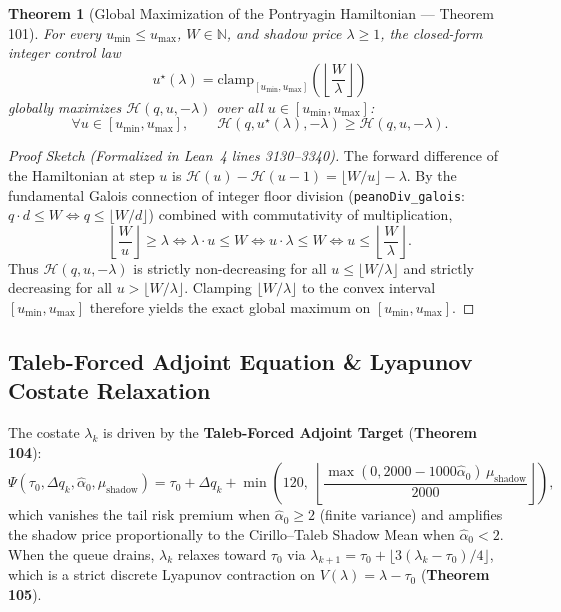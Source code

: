 \documentclass[11pt,a4paper]{article}
\newtheorem{theorem}{Theorem}[section]
\theoremstyle{definition}
\begin{document}
\begin{theorem}[Global Maximization of the Pontryagin Hamiltonian --- Theorem 101]
For every $u_{\min} \le u_{\max}$, $W \in \mathbb{N}$, and shadow price $\lambda \ge 1$, the closed-form integer control law
\[
  u^\star(\lambda) = \mathrm{clamp}_{[u_{\min}, u_{\max}]}\!\left(\left\lfloor \frac{W}{\lambda} \right\rfloor\right)
\]
globally maximizes $\mathcal{H}(q, u, -\lambda)$ over all $u \in [u_{\min}, u_{\max}]$:
\[
  \forall u \in [u_{\min}, u_{\max}], \qquad \mathcal{H}(q, u^\star(\lambda), -\lambda) \ge \mathcal{H}(q, u, -\lambda).
\]
\end{theorem}
\begin{proof}[Proof Sketch (Formalized in Lean~4 lines 3130--3340)]
The forward difference of the Hamiltonian at step $u$ is $\mathcal{H}(u) - \mathcal{H}(u-1) = \lfloor W/u \rfloor - \lambda$. By the fundamental Galois connection of integer floor division (\texttt{peanoDiv\_galois}: $q \cdot d \le W \iff q \le \lfloor W/d \rfloor$) combined with commutativity of multiplication,
\[
  \left\lfloor \frac{W}{u} \right\rfloor \ge \lambda \iff \lambda \cdot u \le W \iff u \cdot \lambda \le W \iff u \le \left\lfloor \frac{W}{\lambda} \right\rfloor.
\]
Thus $\mathcal{H}(q, u, -\lambda)$ is strictly non-decreasing for all $u \le \lfloor W/\lambda \rfloor$ and strictly decreasing for all $u > \lfloor W/\lambda \rfloor$. Clamping $\lfloor W/\lambda \rfloor$ to the convex interval $[u_{\min}, u_{\max}]$ therefore yields the exact global maximum on $[u_{\min}, u_{\max}]$.
\end{proof}

\subsection{Taleb-Forced Adjoint Equation \& Lyapunov Costate Relaxation}

The costate $\lambda_k$ is driven by the \textbf{Taleb-Forced Adjoint Target} (\textbf{Theorem 104}):
\[
  \Psi(\tau_0, \Delta q_k, \widehat{\alpha}_0, \mu_{\mathrm{shadow}}) = \tau_0 + \Delta q_k + \min\!\left(120,\; \left\lfloor \frac{\max(0, 2000 - 1000\widehat{\alpha}_0)\,\mu_{\mathrm{shadow}}}{2000} \right\rfloor\right),
\]
which vanishes the tail risk premium when $\widehat{\alpha}_0 \ge 2$ (finite variance) and amplifies the shadow price proportionally to the Cirillo--Taleb Shadow Mean when $\widehat{\alpha}_0 < 2$. When the queue drains, $\lambda_k$ relaxes toward $\tau_0$ via $\lambda_{k+1} = \tau_0 + \lfloor 3(\lambda_k - \tau_0)/4 \rfloor$, which is a strict discrete Lyapunov contraction on $V(\lambda) = \lambda - \tau_0$ (\textbf{Theorem 105}).
\end{document}
